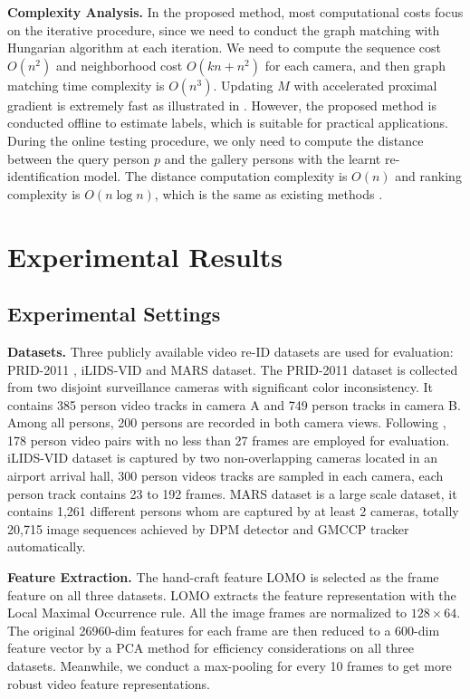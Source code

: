 \documentclass[10pt,twocolumn,letterpaper]{article}
\begin{document}
\textbf{Complexity Analysis.} In the proposed method, most computational costs focus on the iterative procedure, since we need to conduct the graph matching with Hungarian algorithm at each iteration. We need to compute the sequence cost $O(n^2)$ and neighborhood cost $O(kn+n^2)$ for each camera, and then graph matching time complexity is $O(n^3)$. Updating $M$ with accelerated proximal gradient is extremely fast as illustrated in \cite{apg09}. However, the proposed method is conducted offline to estimate labels, which is suitable for practical applications. During the online testing procedure, we only need to compute the distance between the query person $p$ and the gallery persons with the learnt re-identification model. The distance computation complexity is $O(n)$ and ranking complexity is $O(n\log n)$, which is the same as existing methods \cite{cvpr16top,iccv15liao}.

\section{Experimental Results}
\subsection{Experimental Settings}

\textbf{Datasets.} Three publicly available video re-ID datasets are used for evaluation: PRID-2011 \cite{prid2011}, iLIDS-VID \cite{eccv14video} and MARS \cite{eccv16mars} dataset.
The PRID-2011 dataset is collected from two disjoint surveillance cameras with significant color inconsistency. It contains 385 person video tracks in camera A and 749 person tracks in camera B. Among all persons, 200 persons are recorded in both camera views. Following \cite{cvpr16top,ijcai16video,iccv15des,eccv16mars}, 178 person video pairs with no less than 27 frames are employed for evaluation.
iLIDS-VID dataset is captured by two non-overlapping cameras located in an airport arrival hall, 300 person videos tracks are sampled in each camera, each person track contains 23 to 192 frames.
MARS dataset is a large scale dataset, it contains 1,261 different persons whom are captured by at least 2 cameras, totally 20,715 image sequences achieved by DPM detector and GMCCP tracker automatically.

\textbf{Feature Extraction.} The hand-craft feature LOMO \cite{cvpr15lomo} is selected as the frame feature on all three datasets. LOMO extracts the feature representation with the Local Maximal Occurrence rule. All the image frames are normalized to $128 \times 64$. The original 26960-dim features for each frame are then reduced to a 600-dim feature vector by a PCA method for efficiency considerations on all three datasets. Meanwhile, we conduct a max-pooling for every 10 frames to get more robust video feature representations.
\end{document}
